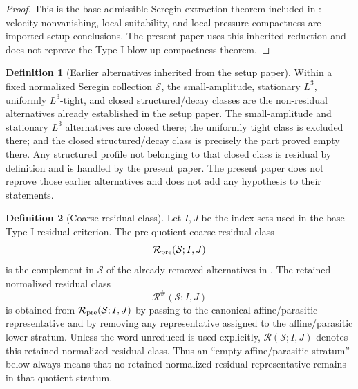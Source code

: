 \documentclass[11pt]{amsart}
\numberwithin{equation}{section}
\theoremstyle{plain}
\theoremstyle{definition}
\newtheorem{definition}[definition]{Definition}
\theoremstyle{remark}
\newcommand{\calS}{\mathcal S}
\newcommand{\calR}{\mathcal R}
\begin{document}
\begin{proof}
This is the base admissible Seregin extraction theorem included in
: velocity nonvanishing, local suitability,
and local pressure compactness are imported setup conclusions.  The present
paper uses this inherited reduction and does not reprove the Type I blow-up
compactness theorem.
\end{proof}

\begin{definition}[Earlier alternatives inherited from the setup paper]
\label{hyp:previous-nonresidual}
Within a fixed normalized Seregin collection \(\calS\), the small-amplitude,
stationary \(L^3\), uniformly \(L^3\)-tight, and closed structured/decay
classes are the non-residual alternatives already established in the setup
paper.  The small-amplitude and stationary \(L^3\) alternatives are closed
there; the uniformly tight class is excluded there; and the closed structured/decay
class is precisely the part proved empty there.  Any structured profile not
belonging to that closed class is residual by definition and is handled by
the present paper.  The present paper does not reprove those earlier
alternatives and does not add any hypothesis to their statements.
\end{definition}

\begin{definition}[Coarse residual class]
\label{def:coarse-residual}
Let \(I,J\) be the index sets used in the base Type I residual
criterion.  The pre-quotient coarse residual class
\[
   \calR_{\rm pre}(\calS;I,J)
\]
is the complement in \(\calS\) of the already removed alternatives in
.  The retained normalized residual class
\[
   \calR^\#(\calS;I,J)
\]
is obtained from \(\calR_{\rm pre}(\calS;I,J)\) by passing to the canonical
affine/parasitic representative and by removing any representative assigned to
the affine/parasitic lower stratum.  Unless the word unreduced is used explicitly,
\(\calR(\calS;I,J)\) denotes this retained normalized residual class.  Thus an
``empty affine/parasitic stratum'' below always means that no retained
normalized residual representative remains in that quotient stratum.
\end{definition}
\end{document}
